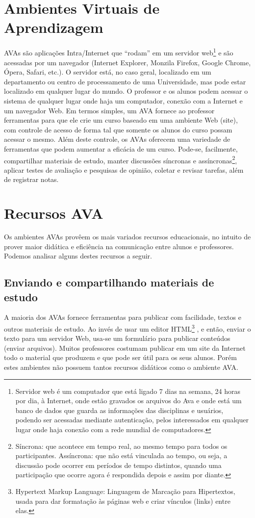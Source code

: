 \section{Ambientes Virtuais de Aprendizagem}

AVAs são aplicações Intra/Internet que “rodam” em um servidor web\footnote{Servidor web é um computador que está ligado 7 dias na semana, 24 horas por dia, à Internet, onde estão gravados os arquivos do Ava e onde está um banco de dados que guarda as informações das disciplinas e usuários, podendo ser acessadas mediante autenticação, pelos interessados em qualquer lugar onde haja conexão com a rede mundial de computadores.}  e são acessadas por um navegador (Internet Explorer, Monzila Firefox, Google Chrome, Ópera, Safari, etc.). O servidor está, no caso geral, localizado em um departamento ou centro de processamento de uma Universidade, mas pode estar localizado em qualquer lugar do mundo. O professor e os alunos podem acessar o sistema de qualquer lugar onde haja um computador, conexão com a Internet e um navegador Web. Em termos simples, um AVA fornece ao professor ferramentas para que ele crie um curso baseado em uma ambiente Web (site), com controle de acesso de forma tal que somente os alunos do curso 
possam acessar o mesmo. Além deste controle, os AVAs oferecem uma variedade de ferramentas que podem aumentar a eficácia de um curso. Pode-se, facilmente, compartilhar materiais de estudo, manter discussões síncronas e assíncronas\footnote{Síncrona: que acontece em tempo real, ao mesmo tempo para todos os participantes. Assíncrona: que não está vinculada ao tempo, ou seja, a discussão pode ocorrer em períodos de tempo distintos, quando uma participação que ocorre agora é respondida depois e assim por diante.}, aplicar testes de avaliação e pesquisas de opinião, coletar e revisar tarefas, além de registrar notas. 


\section{Recursos AVA}
Os ambientes AVAs provêem os mais variados recursos educacionais, no intuito de prover maior didática e eficiência na comunicação entre alunos e professores.  Podemos analisar alguns destes recursos a seguir.

\subsection{Enviando e compartilhando materiais de estudo}
A maioria dos AVAs fornece ferramentas para publicar com facilidade, textos e outros materiais de estudo. Ao invés de usar um editor HTML\footnote{Hypertext Markup Language: Linguagem de Marcação para Hipertextos, usada para dar formatação às páginas web e criar vínculos (links) entre elas.} , e então, enviar o texto para um servidor Web, usa-se um formulário para publicar conteúdos (enviar arquivos). Muitos professores costumam publicar em um site da Internet todo o material que produzem e que pode ser útil para os seus alunos. Porém estes ambientes não possuem tantos recursos didáticos como o ambiente AVA.


